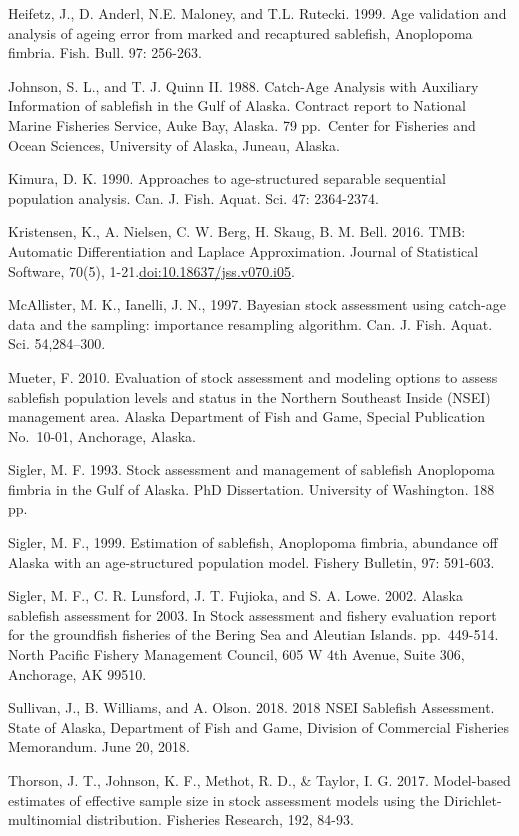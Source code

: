 \documentclass[
]{article}
\begin{document}
Heifetz, J., D. Anderl, N.E. Maloney, and T.L. Rutecki. 1999. Age validation and analysis of ageing error from marked and recaptured sablefish, Anoplopoma fimbria. Fish. Bull. 97: 256-263.

Johnson, S. L., and T. J. Quinn II. 1988. Catch-Age Analysis with Auxiliary Information of sablefish in the Gulf of Alaska. Contract report to National Marine Fisheries Service, Auke Bay, Alaska. 79 pp.~Center for Fisheries and Ocean Sciences, University of Alaska, Juneau, Alaska.

Kimura, D. K. 1990. Approaches to age-structured separable sequential population analysis. Can. J. Fish. Aquat. Sci. 47: 2364-2374.

Kristensen, K., A. Nielsen, C. W. Berg, H. Skaug, B. M. Bell. 2016. TMB: Automatic Differentiation and Laplace Approximation. Journal of Statistical Software, 70(5), 1-21.\url{doi:10.18637/jss.v070.i05}.

McAllister, M. K., Ianelli, J. N., 1997. Bayesian stock assessment using catch-age data and the sampling: importance resampling algorithm. Can. J. Fish. Aquat. Sci. 54,284--300.

Mueter, F. 2010. Evaluation of stock assessment and modeling options to assess sablefish population levels and status in the Northern Southeast Inside (NSEI) management area. Alaska Department of Fish and Game, Special Publication No.~10-01, Anchorage, Alaska.

Sigler, M. F. 1993. Stock assessment and management of sablefish Anoplopoma fimbria in the Gulf of Alaska. PhD Dissertation. University of Washington. 188 pp.

Sigler, M. F., 1999. Estimation of sablefish, Anoplopoma fimbria, abundance off Alaska with an age-structured population model. Fishery Bulletin, 97: 591-603.

Sigler, M. F., C. R. Lunsford, J. T. Fujioka, and S. A. Lowe. 2002. Alaska sablefish assessment for 2003. In Stock assessment and fishery evaluation report for the groundfish fisheries of the Bering Sea and Aleutian Islands. pp.~449-514. North Pacific Fishery Management Council, 605 W 4th Avenue, Suite 306, Anchorage, AK 99510.

Sullivan, J., B. Williams, and A. Olson. 2018. 2018 NSEI Sablefish Assessment. State of Alaska, Department of Fish and Game, Division of Commercial Fisheries Memorandum. June 20, 2018.

Thorson, J. T., Johnson, K. F., Methot, R. D., \& Taylor, I. G. 2017. Model-based estimates of effective sample size in stock assessment models using the Dirichlet-multinomial distribution. Fisheries Research, 192, 84-93.
\end{document}

